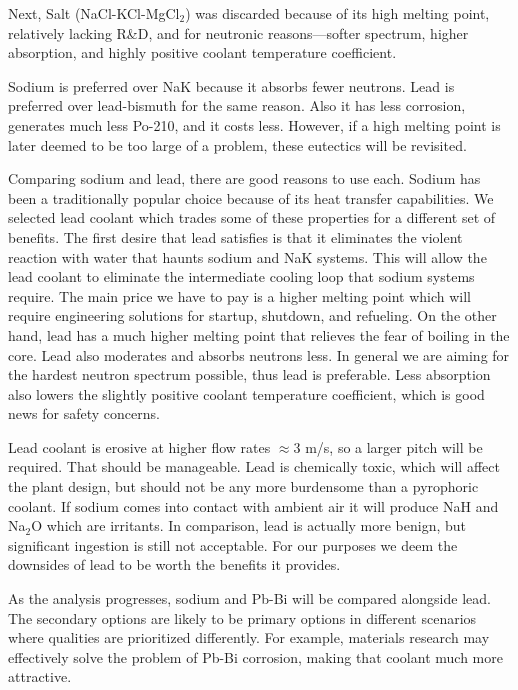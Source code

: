 \documentclass[]{report}
\begin{document}
Next, Salt (NaCl-KCl-MgCl$_2$) was discarded because of its high melting point, relatively lacking R\&D, and for neutronic reasons---softer spectrum, higher absorption, and highly positive coolant temperature coefficient.

Sodium is preferred over NaK because it absorbs fewer neutrons. Lead is preferred over lead-bismuth for the same reason. Also it has less corrosion, generates much less Po-210, and it costs less. 
However, if a high melting point is later deemed to be too large of a problem, these eutectics will be revisited.

Comparing sodium and lead, there are good reasons to use each. Sodium has been a traditionally popular choice because of its heat transfer capabilities. We selected lead coolant which trades some of these properties for a different set of benefits. 
The first desire that lead satisfies is that it eliminates the violent reaction with water that haunts sodium and NaK systems. This will allow the lead coolant to eliminate the intermediate cooling loop that sodium systems require.
The main price we have to pay is a higher melting point which will require engineering solutions for startup, shutdown, and refueling. On the other hand, lead has a much higher melting point that relieves the fear of boiling in the core.
Lead also moderates and absorbs neutrons less. In general we are aiming for the hardest neutron spectrum possible, thus lead is preferable. Less absorption also lowers the slightly positive coolant temperature coefficient, which is good news for safety concerns.

Lead coolant is erosive at higher flow rates $\approx$3 m/s, so a larger pitch will be required. That should be manageable. Lead is chemically toxic, which will affect the plant design, but should not be any more burdensome than a pyrophoric coolant. If sodium comes into contact with ambient air it will produce NaH and Na$_2$O which are irritants. In comparison, lead is actually more benign, but significant ingestion is still not acceptable.
For our purposes we deem the downsides of lead to be worth the benefits it provides.

As the analysis progresses, sodium and Pb-Bi will be compared alongside lead. The secondary options are likely to be primary options in different scenarios where qualities are prioritized differently.
For example, materials research may effectively solve the problem of Pb-Bi corrosion, making that coolant much more attractive.
 
\end{document}
